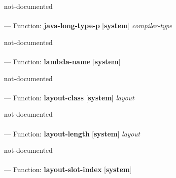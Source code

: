 \begin{adjustwidth}{5em}{5em}
not-documented
\end{adjustwidth}

\paragraph{}
\label{SYSTEM:JAVA-LONG-TYPE-P}
--- Function: \textbf{java-long-type-p} [\textbf{system}] \textit{compiler-type}

\begin{adjustwidth}{5em}{5em}
not-documented
\end{adjustwidth}

\paragraph{}
\label{SYSTEM:LAMBDA-NAME}
--- Function: \textbf{lambda-name} [\textbf{system}] \textit{}

\begin{adjustwidth}{5em}{5em}
not-documented
\end{adjustwidth}

\paragraph{}
\label{SYSTEM:LAYOUT-CLASS}
--- Function: \textbf{layout-class} [\textbf{system}] \textit{layout}

\begin{adjustwidth}{5em}{5em}
not-documented
\end{adjustwidth}

\paragraph{}
\label{SYSTEM:LAYOUT-LENGTH}
--- Function: \textbf{layout-length} [\textbf{system}] \textit{layout}

\begin{adjustwidth}{5em}{5em}
not-documented
\end{adjustwidth}

\paragraph{}
\label{SYSTEM:LAYOUT-SLOT-INDEX}
--- Function: \textbf{layout-slot-index} [\textbf{system}] \textit{}

